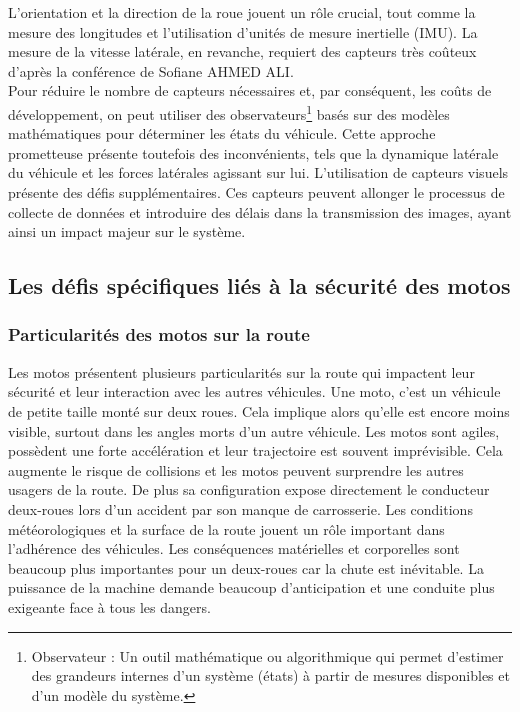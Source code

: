 L'orientation et la direction de la roue jouent un rôle crucial, tout comme la mesure des longitudes et l'utilisation d'unités de mesure inertielle (IMU). La mesure de la vitesse latérale, en revanche, requiert des capteurs très coûteux d'après la conférence\cite{ahmed_ali_synthese_2024} de Sofiane AHMED ALI.\\
Pour réduire le nombre de capteurs nécessaires et, par conséquent, les coûts de développement, on peut utiliser des observateurs\footnote{Observateur : Un outil mathématique ou algorithmique qui permet d’estimer des grandeurs internes d’un système (états) à partir de mesures disponibles et d’un modèle du système.} basés sur des modèles mathématiques pour déterminer les états du véhicule. Cette approche prometteuse présente toutefois des inconvénients, tels que la dynamique latérale du véhicule et les forces latérales agissant sur lui.
L'utilisation de capteurs visuels présente des défis supplémentaires. Ces capteurs peuvent allonger le processus de collecte de données et introduire des délais dans la transmission des images, ayant ainsi un impact majeur sur le système.


\newpage
\subsection{Les défis spécifiques liés à la sécurité des motos}

\subsubsection{Particularités des motos sur la route}
Les motos présentent plusieurs particularités sur la route qui impactent leur sécurité et leur interaction avec les autres véhicules.
Une moto, c'est un véhicule de petite taille monté sur deux roues. Cela implique alors qu'elle est encore moins visible, surtout dans les angles morts d'un autre véhicule. Les motos sont agiles, possèdent une forte accélération et leur trajectoire est souvent imprévisible. Cela augmente le risque de collisions et les motos peuvent surprendre les autres usagers de la route. De plus sa configuration expose directement le conducteur deux-roues lors d'un accident par son manque de carrosserie. Les conditions météorologiques et la surface de la route jouent un rôle important dans l'adhérence des véhicules. Les conséquences matérielles et corporelles sont beaucoup plus importantes pour un deux-roues car la chute est inévitable.
La puissance de la machine demande beaucoup d'anticipation et une conduite plus exigeante face à tous les dangers.\\

